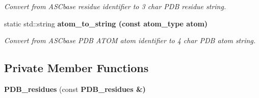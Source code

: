 \begin{CompactItemize}
\begin{CompactList}\small\item\em Convert from ASCbase residue identifier to 3 char PDB residue string. \item\end{CompactList}\item 
static std::string \bf{atom\_\-to\_\-string} (const atom\_\-type atom)\label{classASCbase_1_1PDB__residues_7776d1c208963a0f70edc290f5317b9b}

\begin{CompactList}\small\item\em Convert from ASCbase PDB ATOM atom identifier to 4 char PDB atom string. \item\end{CompactList}\end{CompactItemize}
\subsection*{Private Member Functions}
\begin{CompactItemize}
\item 
\textbf{PDB\_\-residues} (const \bf{PDB\_\-residues} \&)\label{classASCbase_1_1PDB__residues_6bfb18b097f98a13355953456193bccc}

\end{CompactItemize}
